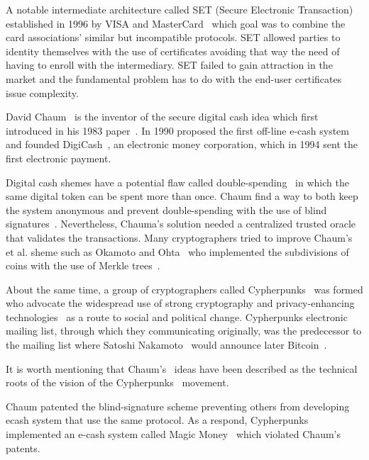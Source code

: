 A notable intermediate architecture called SET (Secure Electronic Transaction) established in 1996 by VISA and MasterCard~\cite{wiki:set}
which goal was to combine the card associations' similar but incompatible protocols. SET allowed parties to identity themselves with the use of
certificates avoiding that way the need of having to enroll with the intermediary. SET failed to gain attraction in the market and the fundamental
problem has to do with the end-user certificates issue complexity.

David Chaum~\cite{wiki:david_chaum} is the inventor of the secure digital cash idea which first introduced in his 1983 paper~\cite{Chaum1983}. In
1990 proposed the first off-line e-cash system~\cite{Chaum:1988:UEC:646753.704915} and founded DigiCash~\cite{wiki:digicash}, an electronic money corporation,
which in 1994 sent the first electronic payment.

Digital cash shemes have a potential flaw called double-spending~\cite{wiki:double_spend,bitcoin_wiki:double_spend} in which the same digital token can be spent more than once.
Chaum find a way to both keep the system anonymous and prevent double-spending with the use of blind signatures~\cite{Chaum1983,Chaum:1988:UEC:646753.704915}.
Nevertheless, Chauma's solution needed a centralized trusted oracle that validates the transactions. Many cryptographers tried to improve Chaum's et al. sheme
such as Okamoto and Ohta~\cite{Watanabe1996} who implemented the subdivisions of coins with the use of Merkle trees~\cite{wiki:merkle_tree}.

About the same time, a group of cryptographers called Cypherpunks~\cite{wiki:cypherpunk,cypherpunks_manifesto} was formed who advocate the widespread
use of strong cryptography and privacy-enhancing technologies~\cite{cypherpunks_manifesto} as a route to social and political change. Cypherpunks electronic mailing list,
through which they communicating originally, was the predecessor to the mailing list where Satoshi Nakamoto~\cite{wiki:satoshi_nakamoto} would announce later Bitcoin~\cite{nakamoto2012bitcoin}.

It is worth mentioning that Chaum's~\cite{wiki:david_chaum} ideas have been described as the technical roots of the vision of the Cypherpunks~\cite{wiki:cypherpunk}
movement.

Chaum patented the blind-signature scheme preventing others from developing ecash system that use the same protocol. As a respond,
Cypherpunks implemented an e-cash system called Magic Money~\cite{magic_money} which violated Chaum's patents.

